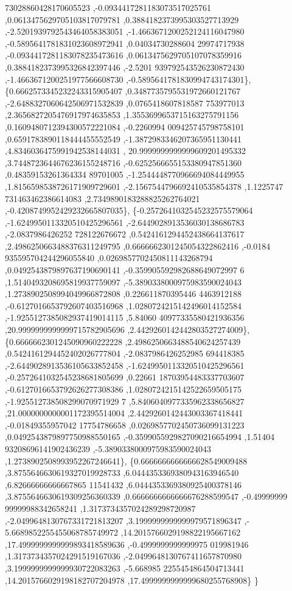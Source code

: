 \begin{DoxyCode}
      73028860428170605523 ,-0.0934417281183073517025761 ,0.0613475629705103817079781 ,0.3884182373995303527713929
       ,-2.5201939792543464058383051 ,-1.4663671200252124116047980 ,-0.5895641781831023608972941 ,0.04034730288604
      29974717938 ,-0.0934417281183078235473616 ,0.0613475629705107078359916 ,0.3884182373995326842397446 ,-2.5201
      939792543526230872430 ,-1.4663671200251977566608730 ,-0.5895641781830994743174301\},
\{0.6662573345232243315905407 ,0.3487735795531972660121767 ,-2.6488327060642506971532839 ,0.0765418607818587
      753977013 ,2.3656827205476917974635853 ,1.3553699653715163275791156 ,0.1609480712394300572221084 ,-0.2260994
      009425745798758101 ,0.6591783890118444455552549 ,-1.3872983346207365951130441 ,4.8346036475991942538144031 ,
      20.9999999999999609201495332 ,3.7448723644676236155248716 ,-0.6252566655153380947851360 ,0.48359153261364334
      89701005 ,-1.2544448770966694084449955 ,1.8156598538726171909729601 ,-2.1567544796692410535854378 ,1.1225747
      731463462386614083 ,2.7349890183288825262764021 ,-0.4208749952429232665807035\},
\{-0.2572641032545232575579064 ,-1.6249950113320510425296561 ,-2.6449028913536030138686783 ,-2.0837986426252
      728122676672 ,0.5424161294452438664137617 ,2.4986250663488376311249795 ,0.6666662301245054322862416 ,-0.0184
      935595704244296055840 ,0.0269857702450811143268794 ,0.0492543879897637190690141 ,-0.359905592982688649072997
      6 ,1.5140493208695819937759097 ,-5.3890338000975983590024043 ,1.2738902508994049966872808 ,0.226611870395446
      4463912188 ,-0.6127016653792607403516968 ,1.0280724215142496014152584 ,-1.9255127385082937419014115 ,5.84060
      40977335580421936356 ,20.9999999999999715782905696 ,2.4429260142442803527274009\},
\{0.6666662301245090960222228 ,2.4986250663488540624257439 ,0.5424161294452402026777804 ,-2.0837986426252985
      694418385 ,-2.6449028913536105633852458 ,-1.6249950113320510425296561 ,-0.2572641032545238681805699 ,0.22661
      18703954483337703607 ,-0.6127016653792626277308386 ,1.0280724215142522659505175 ,-1.925512738508299070971929
      7 ,5.8406040977335962338656827 ,21.0000000000001172395514004 ,2.4429260142443003367418441 ,-0.01849355957042
      17754786658 ,0.0269857702450736099131223 ,0.0492543879897750988550165 ,-0.3599055929827090216654994 ,1.51404
      93208696141902436239 ,-5.3890338000975983590024043 ,1.2738902508993952267246641\},
\{0.6666666666666628549009488 ,3.8755646630619327019928733 ,6.0444353369380943163946540 ,6.82666666666667865
      11541432 ,6.0444353369380925400378146 ,3.8755646630619309256360339 ,0.6666666666666676288599547 ,-0.49999999
      99999988342658241 ,1.3173734357024289298720987 ,-2.0499648130767331721813207 ,3.1999999999999979571896347 ,-
      5.6689852255455068785749972 ,14.2015766029198822195667162 ,17.4999999999999893418589636 ,-0.4999999999999975
      019981946 ,1.3173734357024291519167036 ,-2.0499648130767411657870980 ,3.1999999999999930722083263 ,-5.668985
      2255454864504713441 ,14.2015766029198182707204978 ,17.4999999999999680255768908\}
\}
\end{DoxyCode}
